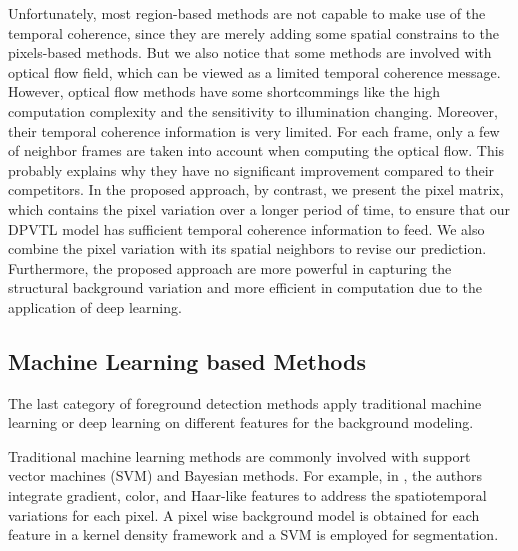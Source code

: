 \documentclass[journal]{IEEEtran}
\begin{document}
Unfortunately, most region-based methods are not capable to make use of the temporal coherence, since they are merely adding some spatial constrains to the pixels-based methods. 
But we also notice that some methods are involved with optical flow field, which can be viewed as a limited temporal coherence message. 
However, optical flow methods have some shortcommings like the high computation complexity and the sensitivity to illumination changing. 
Moreover, their temporal coherence information is very limited. For each frame, only a few of neighbor frames are taken into account when computing the optical flow.
This probably explains why they have no significant improvement compared to their competitors.    
In the proposed approach, by contrast, we present the pixel matrix, which contains the pixel variation over a longer period of time, to ensure that our DPVTL model has sufficient temporal coherence information to feed.
We also combine the pixel variation with its spatial neighbors to revise our prediction.
Furthermore, the proposed approach are more powerful in capturing the structural background variation and more efficient in computation due to the application of deep learning.


\subsection{Machine Learning based Methods}
The last category of foreground detection methods apply traditional machine learning or deep learning on different features for the background modeling.

Traditional machine learning methods are commonly involved with support vector machines (SVM) and Bayesian methods\cite{Zhang2014Statis}. For example, in \cite{Han2012}, the authors integrate gradient, color, and Haar-like features to address the spatiotemporal variations for each pixel. A pixel wise background model is obtained for each feature in a kernel density framework and a SVM is employed for segmentation.
\end{document}
